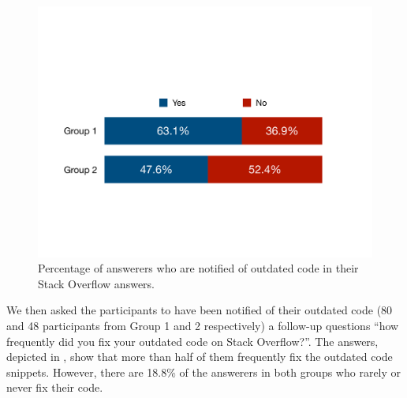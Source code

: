 \documentclass[10pt,journal,compsoc]{IEEEtran}
\begin{document}
\begin{figure}
	\centering
	\includegraphics[width=.8\linewidth]{survey_outdated}
	\caption{Percentage of answerers who are notified of outdated code in their Stack Overflow answers.}
	\label{fig:survey_outdated}
\end{figure}%

We then asked the participants to have been notified of their outdated code
(80 and 48 participants from Group 1 and 2 respectively) a
follow-up questions ``how frequently did you fix your outdated code on Stack
Overflow?''. The answers, depicted in , show that
more than half of them frequently fix the outdated code snippets. However, there
are 18.8\% of the answerers in both groups who rarely or never fix their code.
\end{document}

